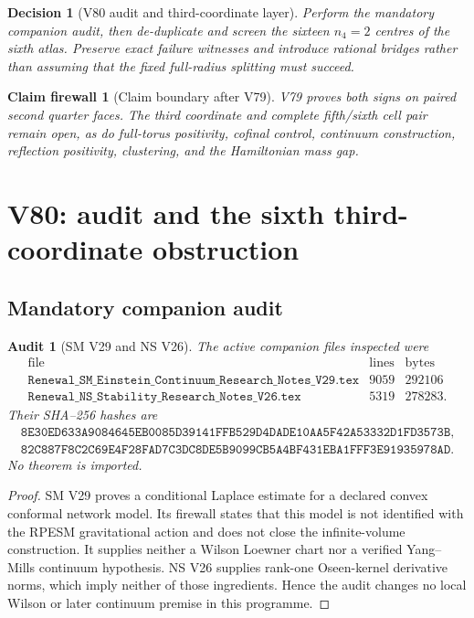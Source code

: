 \documentclass[11pt,oneside]{article}
\newtheorem{firewall}[theorem]{Claim firewall}
\newtheorem{audit}[theorem]{Audit}
\newtheorem{decision}[theorem]{Decision}
\theoremstyle{definition}
\theoremstyle{remark}
\begin{document}
\begin{decision}[V80 audit and third-coordinate layer]
\label{dec:newv79-next}
Perform the mandatory companion audit, then de-duplicate and screen
the sixteen \(n_4=2\) centres of the sixth atlas.  Preserve exact
failure witnesses and introduce rational bridges rather than
assuming that the fixed full-radius splitting must succeed.
\end{decision}

\begin{firewall}[Claim boundary after V79]
\label{fire:newv79-final}
V79 proves both signs on paired second quarter faces.  The third
coordinate and complete fifth/sixth cell pair remain open, as do
full-torus positivity, cofinal control, continuum construction,
reflection positivity, clustering, and the Hamiltonian mass gap.
\end{firewall}

\section{V80: audit and the sixth third-coordinate obstruction}
\label{sec:newv80-sixth-third-obstruction}

\subsection{Mandatory companion audit}

\begin{audit}[SM V29 and NS V26]
\label{audit:newv80-companions}
The active companion files inspected were
\[
\begin{array}{c|r|r}
\text{file}&\text{lines}&\text{bytes}\\ \hline
\texttt{Renewal\_SM\_Einstein\_Continuum\_Research\_Notes\_V29.tex}
 &9059&292106\\
\texttt{Renewal\_NS\_Stability\_Research\_Notes\_V26.tex}
 &5319&278283.
\end{array}                                             \tag{80.1}
\]
Their SHA--256 hashes are
\[
\begin{gathered}
\texttt{8E30ED633A9084645EB0085D39141FFB529D4DADE10AA5F42A53332D1FD3573B},\\
\texttt{82C887F8C2C69E4F28FAD7C3DC8DE5B9099CB5A4BF431EBA1FFF3E91935978AD}.
\end{gathered}                                          \tag{80.2}
\]
No theorem is imported.
\end{audit}

\begin{proof}
SM V29 proves a conditional Laplace estimate for a declared convex
conformal network model.  Its firewall states that this model is not
identified with the RPESM gravitational action and does not close
the infinite-volume construction.  It supplies neither a Wilson
Loewner chart nor a verified Yang--Mills continuum hypothesis.
NS V26 supplies rank-one Oseen-kernel derivative norms, which imply
neither of those ingredients.  Hence the audit changes no local
Wilson or later continuum premise in this programme.
\end{proof}
\end{document}
